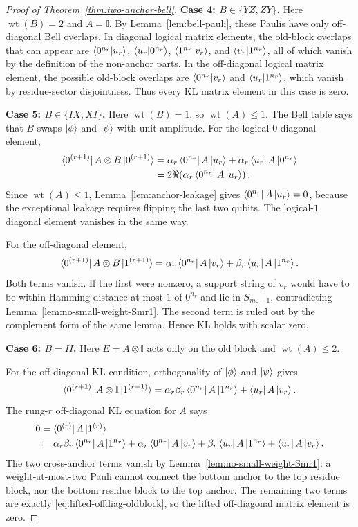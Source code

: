 \documentclass[11pt]{article}
\newcommand{\wt}{\operatorname{wt}}
\newcommand{\id}{\mathbb I}
\newcommand{\ketphi}{\ket{\phi}}
\newcommand{\ketpsi}{\ket{\psi}}
\begin{document}
\begin{proof}[Proof of Theorem~\ref{thm:two-anchor-bell}]
\medskip
\noindent\textbf{Case 4: $B\in\{YZ,ZY\}$.}
Here $\wt(B)=2$ and $A=\id$.  By Lemma~\ref{lem:bell-pauli}, these Paulis have only off-diagonal
Bell overlaps.  In diagonal logical matrix elements, the old-block overlaps that can appear are
$\braket{0^{n_r}|u_r}$, $\braket{u_r|0^{n_r}}$, $\braket{1^{n_r}|v_r}$, and
$\braket{v_r|1^{n_r}}$, all of which vanish by the definition of the non-anchor parts.  In the
off-diagonal logical matrix element, the possible old-block overlaps are
$\braket{0^{n_r}|v_r}$ and $\braket{u_r|1^{n_r}}$, which vanish by residue-sector disjointness.
Thus every KL matrix element in this case is zero.

\medskip
\noindent\textbf{Case 5: $B\in\{IX,XI\}$.}
Here $\wt(B)=1$, so $\wt(A)\le1$.  The Bell table says that $B$ swaps $\ketphi$ and $\ketpsi$ with
unit amplitude.  For the logical-$0$ diagonal element,
\begin{align*}
  \bra{0^{(r+1)}}A\otimes B\ket{0^{(r+1)}}
  &=\alpha_r\bra{0^{n_r}}A\ket{u_r}
    +\alpha_r\bra{u_r}A\ket{0^{n_r}} \\
  &=2\Re\!\left(\alpha_r\bra{0^{n_r}}A\ket{u_r}\right).
\end{align*}
Since $\wt(A)\le1$, Lemma~\ref{lem:anchor-leakage} gives
$\bra{0^{n_r}}A\ket{u_r}=0$, because the exceptional leakage requires flipping the last two
qubits.  The logical-$1$ diagonal element vanishes in the same way.

For the off-diagonal element,
\[
  \bra{0^{(r+1)}}A\otimes B\ket{1^{(r+1)}}
  =\alpha_r\bra{0^{n_r}}A\ket{v_r}
   +\beta_r\bra{u_r}A\ket{1^{n_r}}.
\]
Both terms vanish.  If the first were nonzero, a support string of $v_r$ would have to be within
Hamming distance at most $1$ of $0^{n_r}$ and lie in $S_{m_r-1}$, contradicting
Lemma~\ref{lem:no-small-weight-Smr1}.  The second term is ruled out by the complement form of the
same lemma.  Hence KL holds with scalar zero.

\medskip
\noindent\textbf{Case 6: $B=II$.}
Here $E=A\otimes\id$ acts only on the old block and $\wt(A)\le2$.

For the off-diagonal KL condition, orthogonality of $\ketphi$ and $\ketpsi$ gives
\begin{equation}
  \bra{0^{(r+1)}}A\otimes\id\ket{1^{(r+1)}}
  =\alpha_r\beta_r\bra{0^{n_r}}A\ket{1^{n_r}}
   +\bra{u_r}A\ket{v_r}.
  \label{eq:lifted-offdiag-oldblock}
\end{equation}
The rung-$r$ off-diagonal KL equation for $A$ says
\begin{align}
0&=\bra{0^{(r)}}A\ket{1^{(r)}} \nonumber\\
 &=\alpha_r\beta_r\bra{0^{n_r}}A\ket{1^{n_r}}
 +\alpha_r\bra{0^{n_r}}A\ket{v_r}
 +\beta_r\bra{u_r}A\ket{1^{n_r}}
 +\bra{u_r}A\ket{v_r}.
 \label{eq:rung-r-offdiag-expanded}
\end{align}
The two cross-anchor terms vanish by Lemma~\ref{lem:no-small-weight-Smr1}: a weight-at-most-two
Pauli cannot connect the bottom anchor to the top residue block, nor the bottom residue block to
the top anchor.  The remaining two terms are exactly
\eqref{eq:lifted-offdiag-oldblock}, so the lifted off-diagonal matrix element is zero.


\end{proof}
\end{document}
